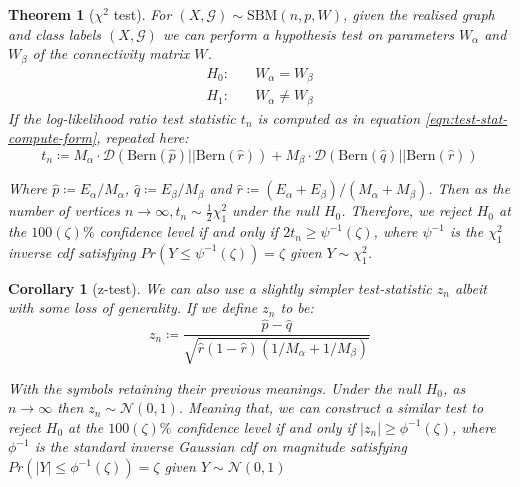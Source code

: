 \documentclass[]{article}
\newcommand{\Gaussian}{\mathcal{N}}
\newcommand{\Gcal}{\mathcal{G}}
\newcommand{\kl}{\mathcal{D}}
\newtheorem{theorem}{Theorem}[section]
\newtheorem{corollary}{Corollary}[theorem]
\begin{document}
\begin{theorem}[$\chi^2$ test]
	For $(X, \Gcal) \sim \textrm{SBM}(n, p, W)$, given the realised graph and class labels $(X, \Gcal)$ we can perform a hypothesis test on parameters $W_\alpha$ and $W_\beta$ of the connectivity matrix $W$.
	\begin{align*}
	H_0:& \quad W_{\alpha} = W_{\beta} \\
	H_1:& \quad W_{\alpha} \neq W_{\beta}
	\end{align*}
	If the log-likelihood ratio test statistic $t_n$ is computed as in equation \ref{eqn:test-stat-compute-form}, repeated here:
	\begin{equation*}
		t_n \coloneqq  M_\alpha \cdot \kl\left( \textrm{Bern}(\hat{p}) || \textrm{Bern}(\hat{r})\right) + 
		M_\beta \cdot \kl\left( \textrm{Bern}(\hat{q}) || \textrm{Bern}(\hat{r})\right)
	\end{equation*}
	
	Where $\hat{p} \coloneqq E_\alpha / M_\alpha$, $\hat{q} \coloneqq E_\beta / M_\beta$ and $\hat{r} \coloneqq (E_\alpha + E_\beta) / (M_\alpha + M_\beta)$. Then as the number of vertices $n \rightarrow \infty, t_n \sim \frac{1}{2} \chi^2_1$ under the null $H_0$. Therefore, we reject $H_0$ at the $100(\zeta)\%$ confidence level if and only if $2t_n \geq \psi^{-1}(\zeta)$, where $\psi^{-1}$ is the $\chi^2_1$ inverse cdf satisfying $Pr(Y \leq \psi^{-1}(\zeta)) = \zeta$ given $Y \sim \chi^2_1$.
	
	\label{theorem:hyp-test-sbm-chi}
\end{theorem}

\begin{corollary}[z-test]
	We can also use a slightly simpler test-statistic $z_n$ albeit with some loss of generality. If we define $z_n$ to be:
	\begin{equation*}
		z_n \coloneqq \frac{\hat{p} - \hat{q}}{\sqrt{\hat{r}(1- \hat{r})(1/M_\alpha + 1/M_\beta)}}
	\end{equation*}
	
	With the symbols retaining their previous meanings. Under the null $H_0$, as $n \rightarrow \infty$ then $z_n \sim \Gaussian(0, 1)$. Meaning that, we can construct a similar test to reject $H_0$ at the $100(\zeta)\%$ confidence level if and only if $|z_n| \geq \phi^{-1}(\zeta)$, where $\phi^{-1}$ is the standard inverse Gaussian cdf on magnitude satisfying $Pr(|Y| \leq \phi^{-1}(\zeta)) = \zeta$ given $Y \sim \Gaussian(0, 1)$
\end{corollary}
\end{document}
